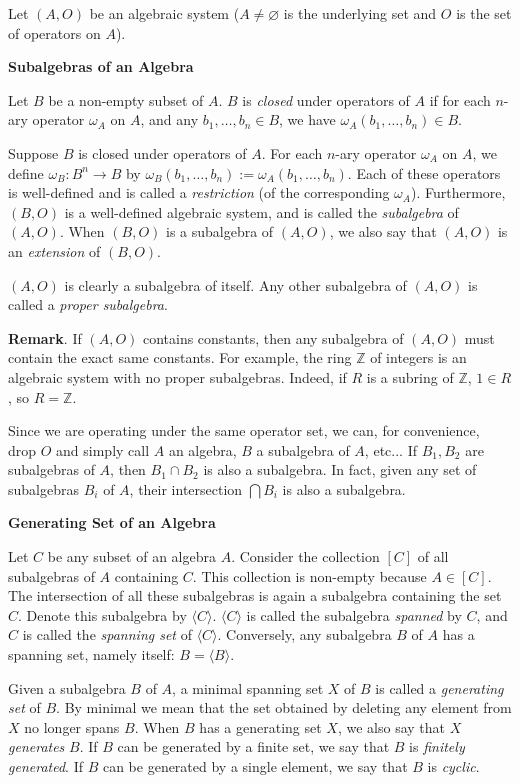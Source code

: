 \documentclass[12pt]{article}
\begin{document}
Let $(A,O)$ be an algebraic system ($A\ne \varnothing$ is the underlying set and $O$ is the set of operators on $A$).

\textbf{Subalgebras of an Algebra}

Let $B$ be a non-empty subset of $A$.  $B$ is \emph{closed} under operators of $A$ if for each $n$-ary operator $\omega_A$ on $A$, and any $b_1,\ldots,b_n\in B$, we have $\omega_A(b_1,\ldots,b_n)\in B$.

Suppose $B$ is closed under operators of $A$.  For each $n$-ary operator $\omega_A$ on $A$, we define $\omega_B:B^n\to B$ by $\omega_B(b_1,\ldots,b_n):= \omega_A(b_1,\ldots,b_n)$.  Each of these operators is well-defined and is called a \emph{restriction} (of the corresponding $\omega_A$).  Furthermore, $(B,O)$ is a well-defined algebraic system, and is called the \emph{subalgebra} of $(A,O)$.  When $(B,O)$ is a subalgebra of $(A,O)$, we also say that $(A,O)$ is an \emph{extension} of $(B,O)$.

$(A,O)$ is clearly a subalgebra of itself.  Any other subalgebra of $(A,O)$ is called a \emph{proper subalgebra}.

\textbf{Remark}.  If $(A,O)$ contains constants, then any subalgebra of $(A,O)$ must contain the exact same constants.  For example, the ring $\mathbb{Z}$ of integers is an algebraic system with no proper subalgebras.  Indeed, if $R$ is a subring of $\mathbb{Z}$, $1\in R$, so $R=\mathbb{Z}$.

Since we are operating under the same operator set, we can, for convenience, drop $O$ and simply call $A$ an algebra, $B$ a subalgebra of $A$, etc...  If $B_1,B_2$ are subalgebras of $A$, then $B_1\cap B_2$ is also a subalgebra.  In fact, given any set of subalgebras $B_i$ of $A$, their intersection $\bigcap B_i$ is also a subalgebra.

\textbf{Generating Set of an Algebra}

Let $C$ be any subset of an algebra $A$.  Consider the collection $[C]$ of all subalgebras of $A$ containing $C$.  This collection is non-empty because $A\in [C]$.  The intersection of all these subalgebras is again a subalgebra containing the set $C$.  Denote this subalgebra by $\langle C\rangle$.   $\langle C\rangle$ is called the subalgebra \emph{spanned} by $C$, and $C$ is called the \emph{spanning set} of $\langle C\rangle$.  Conversely, any subalgebra $B$ of $A$ has a spanning set, namely itself: $B=\langle B\rangle$.

Given a subalgebra $B$ of $A$, a minimal spanning set $X$ of $B$ is called a \emph{generating set} of $B$.  By minimal we mean that the set obtained by deleting any element from $X$ no longer spans $B$.  When $B$ has a generating set $X$, we also say that $X$ \emph{generates} $B$.   If $B$ can be generated by a finite set, we say that $B$ is \emph{finitely generated}.  If $B$ can be generated by a single element, we say that $B$ is \emph{cyclic}.
\end{document}
